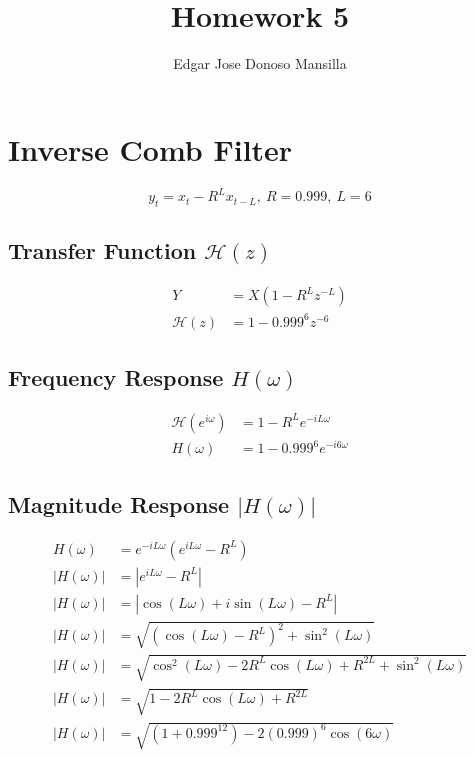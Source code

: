 \documentclass{article}
\newcommand{\transf}[1]{\mathcal H(#1)}
\newcommand{\freq}[1]{H(#1)}
\newcommand{\magres}[1]{|\freq{#1}|}
\begin{document}
\title{Homework 5}
\author{Edgar Jose Donoso Mansilla}
\date{}
\maketitle

\section{Inverse Comb Filter}
$$
	y_t = x_t - R^L x_{t-L},\ R = 0.999,\ L = 6
$$

\subsection{Transfer Function $\transf{z}$}
\begin{align*}
	Y          & = X(1 - R^L z^{-L})  \\
	\transf{z} & = 1 - 0.999^6 z^{-6}
\end{align*}

\subsection{Frequency Response $\freq{\omega}$}
\begin{align*}
	\transf{e^{i \omega}} & = 1 - R^L e^{-i L \omega}     \\
	\freq{\omega}         & = 1 - 0.999^6 e^{-i 6 \omega}
\end{align*}

\subsection{Magnitude Response $\magres{\omega}$}
\begin{align*}
	\freq{\omega}   & = e^{-i L \omega}(e^{i L \omega} - R^{L})                                   \\
	\magres{\omega} & = |e^{i L \omega} - R^{L}|                                                  \\
	\magres{\omega} & = |\cos(L \omega) + i\sin(L \omega) - R^L|                                  \\
	\magres{\omega} & = \sqrt{(\cos(L \omega) - R^L)^2 + \sin^2(L \omega)}                        \\
	\magres{\omega} & = \sqrt{\cos^2(L \omega) - 2R^L \cos(L \omega) + R^{2L} + \sin^2(L \omega)} \\
	\magres{\omega} & = \sqrt{1 - 2R^L \cos(L \omega) + R^{2L}}                                   \\
	\magres{\omega} & = \sqrt{(1 + 0.999^{12}) - 2(0.999)^6 \cos(6 \omega)}
\end{align*}
\end{document}
